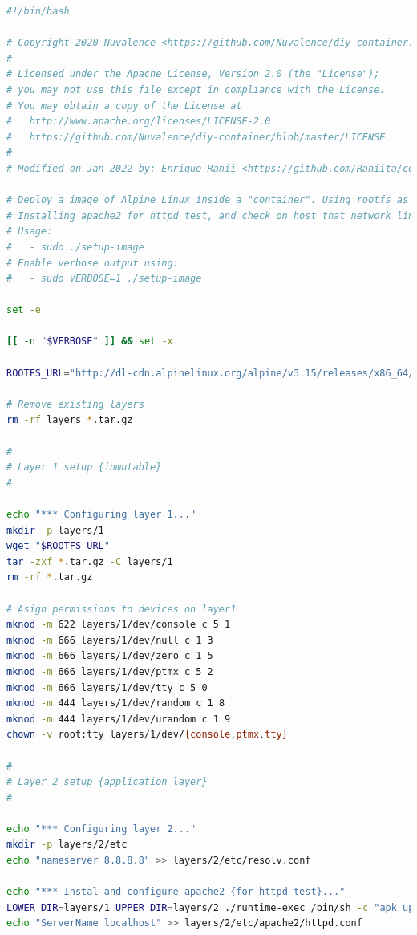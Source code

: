 \documentclass[12pt]{article}
\begin{document}
	\begin{lstlisting}[language=bash, caption={Creación de imagen para contenedor utilizando Alpine y union mounts}]
#!/bin/bash

# Copyright 2020 Nuvalence <https://github.com/Nuvalence/diy-container.git>
# 
# Licensed under the Apache License, Version 2.0 (the "License");
# you may not use this file except in compliance with the License.
# You may obtain a copy of the License at
#   http://www.apache.org/licenses/LICENSE-2.0
#   https://github.com/Nuvalence/diy-container/blob/master/LICENSE
#
# Modified on Jan 2022 by: Enrique Ranii <https://github.com/Raniita/container-alpine.git>

# Deploy a image of Alpine Linux inside a "container". Using rootfs as Union Filesystem
# Installing apache2 for httpd test, and check on host that network link is enabled
# Usage:
#   - sudo ./setup-image
# Enable verbose output using:
#   - sudo VERBOSE=1 ./setup-image

set -e

[[ -n "$VERBOSE" ]] && set -x

ROOTFS_URL="http://dl-cdn.alpinelinux.org/alpine/v3.15/releases/x86_64/alpine-minirootfs-3.15.0-x86_64.tar.gz"

# Remove existing layers
rm -rf layers *.tar.gz

#
# Layer 1 setup {inmutable}
#

echo "*** Configuring layer 1..."
mkdir -p layers/1
wget "$ROOTFS_URL"
tar -zxf *.tar.gz -C layers/1
rm -rf *.tar.gz

# Asign permissions to devices on layer1
mknod -m 622 layers/1/dev/console c 5 1
mknod -m 666 layers/1/dev/null c 1 3
mknod -m 666 layers/1/dev/zero c 1 5
mknod -m 666 layers/1/dev/ptmx c 5 2
mknod -m 666 layers/1/dev/tty c 5 0
mknod -m 444 layers/1/dev/random c 1 8
mknod -m 444 layers/1/dev/urandom c 1 9
chown -v root:tty layers/1/dev/{console,ptmx,tty}

#
# Layer 2 setup {application layer}
#

echo "*** Configuring layer 2..."
mkdir -p layers/2/etc
echo "nameserver 8.8.8.8" >> layers/2/etc/resolv.conf

echo "*** Instal and configure apache2 {for httpd test}..."
LOWER_DIR=layers/1 UPPER_DIR=layers/2 ./runtime-exec /bin/sh -c "apk update && apk add apache2"
echo "ServerName localhost" >> layers/2/etc/apache2/httpd.conf
	\end{lstlisting}
	
	\pagebreak
	
\end{document}
